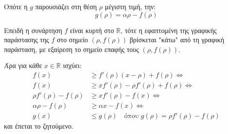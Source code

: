 Οπότε η $g$ παρουσιάζει στη θέση $\rho$ μέγιστη τιμή, την:
\[ g(\rho) = \alpha \rho - f(\rho) \]

Επειδή η συνάρτηση $f$ είναι κυρτή στο $\mathbb{R}$, τότε η εφαπτομένη της γραφικής παράστασης της $f$ στο σημείο $(\rho, f(\rho))$ βρίσκεται "κάτω" από τη γραφική παράσταση, με εξαίρεση το σημείο επαφής τους $(\rho, f(\rho))$.

Άρα για κάθε $x \in \mathbb{R}$ ισχύει:
\begin{align*}
    f(x) &\ge f'(\rho)(x - \rho) + f(\rho) \Leftrightarrow \\
    f(x) &\ge xf'(\rho) - \rho f'(\rho) + f(\rho) \Leftrightarrow \\
    \rho f'(\rho) - f(\rho) &\ge xf'(\rho) - f(x) \Leftrightarrow \\
    \alpha \rho - f(\rho) &\ge \alpha x - f(x) \Leftrightarrow \\
    g(x) &\le g(\rho) \quad \text{όπου } g(\rho) = \rho f'(\rho) - f(\rho)
\end{align*}
και έπεται το ζητούμενο.